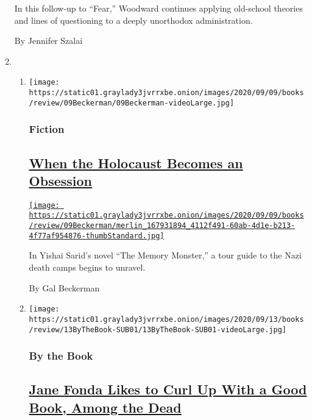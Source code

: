 \begin{enumerate}
  In this follow-up to ``Fear,'' Woodward continues applying old-school
  theories and lines of questioning to a deeply unorthodox
  administration.

  By Jennifer Szalai
\item
  \begin{enumerate}
  \def\labelenumii{\arabic{enumii}.}
  \item
    \texttt{[image: https://static01.graylady3jvrrxbe.onion/images/2020/09/09/books/review/09Beckerman/09Beckerman-videoLarge.jpg]}

    \hypertarget{fiction}{%
    \subsubsection{Fiction}\label{fiction}}

    \hypertarget{when-the-holocaust-becomes-an-obsession}{%
    \subsection{\texorpdfstring{\href{/2020/09/08/books/review/memory-monster-yishai-sarid.html}{When
    the Holocaust Becomes an
    Obsession}}{When the Holocaust Becomes an Obsession}}\label{when-the-holocaust-becomes-an-obsession}}

    \href{/2020/09/08/books/review/memory-monster-yishai-sarid.html}{\texttt{[image: https://static01.graylady3jvrrxbe.onion/images/2020/09/09/books/review/09Beckerman/merlin\_167931894\_4112f491-60ab-4d1e-b213-4f77af954876-thumbStandard.jpg]}}

    In Yishai Sarid's novel ``The Memory Monster,'' a tour guide to the
    Nazi death camps begins to unravel.

    By Gal Beckerman
  \item
    \texttt{[image: https://static01.graylady3jvrrxbe.onion/images/2020/09/13/books/review/13ByTheBook-SUB01/13ByTheBook-SUB01-videoLarge.jpg]}

    \hypertarget{by-the-book}{%
    \subsubsection{By the Book}\label{by-the-book}}

    \hypertarget{jane-fonda-likes-to-curl-up-with-a-good-book-among-the-dead}{%
    \subsection{\texorpdfstring{\href{/2020/09/10/books/review/jane-fonda-by-the-book-interview.html}{Jane
    Fonda Likes to Curl Up With a Good Book, Among the
    Dead}}{Jane Fonda Likes to Curl Up With a Good Book, Among the Dead}}\label{jane-fonda-likes-to-curl-up-with-a-good-book-among-the-dead}}


\end{enumerate}
\end{enumerate}
